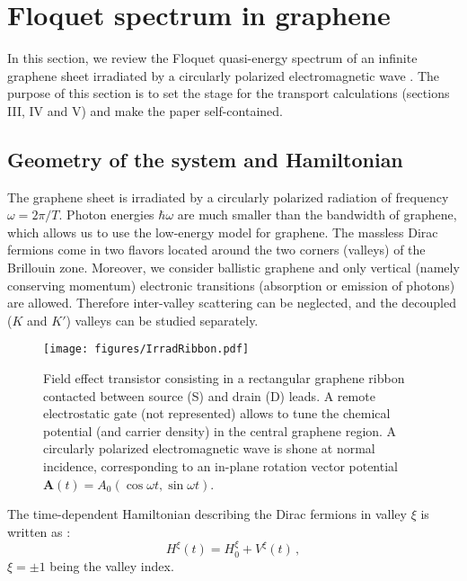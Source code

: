 \documentclass[aps,prb,showpacs,superscriptaddress,twocolumn,10pt,floatfix]{revtex4-1}
\begin{document}
\section{Floquet spectrum in graphene}

In this section, we review the Floquet quasi-energy spectrum of an infinite graphene sheet irradiated by a circularly polarized electromagnetic wave \cite{Zhou2011,Oka2009,Usaj2014,Perez-Piskunow2015,Gu2011}. The purpose of this section is to set the stage for the transport calculations (sections III, IV and V) and make the paper self-contained. 


\subsection{Geometry of the system and Hamiltonian}

The graphene sheet is irradiated by a circularly polarized radiation of frequency $\omega=2\pi/T$. Photon energies $\hbar\omega$ are much smaller than the bandwidth of graphene, which allows us to use the low-energy model for graphene. The massless Dirac fermions come in two flavors located around the two corners (valleys) of the Brillouin zone. Moreover, we consider ballistic graphene and only vertical (namely conserving momentum) electronic transitions (absorption or emission of photons) are allowed. Therefore inter-valley scattering can be neglected, and the decoupled ($K$ and $K'$) valleys can be studied separately.

\begin{figure}[h!]
	\texttt{[image: figures/IrradRibbon.pdf]} \\
	\caption{Field effect transistor consisting in a rectangular graphene ribbon contacted between source (S) and drain (D) leads. A remote electrostatic gate (not represented) allows to tune the chemical potential (and carrier density) in the central graphene region. A 
	circularly polarized electromagnetic wave is shone at normal incidence, corresponding to an in-plane rotation vector potential $\mathbf{A}(t)=A_0(\cos\omega t,\sin\omega t)$.}
	\label{fig:transistor}
\end{figure}

The time-dependent Hamiltonian describing the Dirac fermions in valley $\xi$ is written as :
\begin{equation}
H^\xi (t)=H_0^\xi  + V^\xi (t) \, ,
\label{eq:Hamiltonian} 
\end{equation}
$\xi=\pm 1$ being the valley index. 
\end{document}
